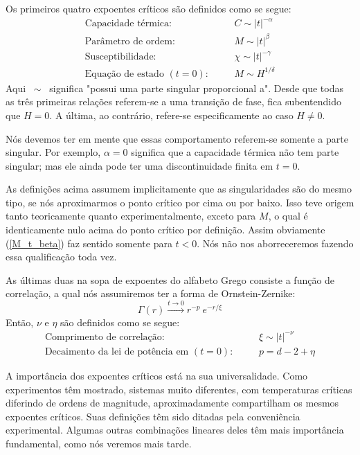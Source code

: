 Os primeiros quatro expoentes críticos são definidos como se segue:
\begin{eqnarray}
\text{Capacidade térmica:} ~&~&~~~ C \sim |t|^{-\alpha}\\
\text{Parâmetro de ordem:} ~&~&~~~ M \sim |t|^{\beta} \label{M_t_beta}\\
\text{Susceptibilidade:}   ~&~&~~~ \chi \sim |t|^{-\gamma}\\
\text{Equação de estado }(t=0)\text{:} ~&~&~~~ M \sim H^{1/\delta}
\end{eqnarray}
Aqui $~\sim~$ significa "possui uma parte singular proporcional a". Desde que todas as três primeiras relações referem-se a uma transição de fase, fica subentendido que $H=0$. A última, ao contrário, refere-se especificamente ao caso $H \neq 0$.

Nós devemos ter em mente que essas comportamento referem-se somente a parte singular. Por exemplo, $\alpha=0$ significa que a capacidade térmica não tem parte singular; mas ele ainda pode ter uma discontinuidade finita em $t=0$.

As definições acima assumem implicitamente que as singularidades são do mesmo tipo, se nós aproximarmos o ponto crítico por cima ou por baixo. Isso teve origem tanto teoricamente quanto experimentalmente, exceto para $M$, o qual é identicamente nulo acima do ponto crítico por definição. Assim obviamente (\ref{M_t_beta}) faz sentido somente para $t<0$. Nós não nos aborreceremos fazendo essa qualificação toda vez.

As últimas duas na sopa de expoentes do alfabeto Grego consiste a função de correlação, a qual nós assumiremos ter a forma de Ornstein-Zernike:
\begin{equation}
\Gamma(r) \stackrel{t \rightarrow 0}{\longrightarrow} r^{-p}~e^{-r/\xi}
\label{gamma_r_ornsteion-zernike}
\end{equation}
Então, $\nu$ e $\eta$ são definidos como se segue:
\begin{eqnarray}
\text{Comprimento de correlação:} ~&~&~~~ \xi \sim |t|^{-\nu}\\
\text{Decaimento da lei de potência em }(t=0)\text{:} ~&~&~~~ p = d-2+\eta
\end{eqnarray}

A importância dos expoentes críticos está na sua universalidade. Como experimentos têm mostrado, sistemas muito diferentes, com temperaturas críticas diferindo de ordens de magnitude, aproximadamente compartilham os mesmos expoentes críticos. Suas definições têm sido ditadas pela conveniência experimental. Algumas outras combinações lineares deles têm mais importância fundamental, como nós veremos mais tarde.

